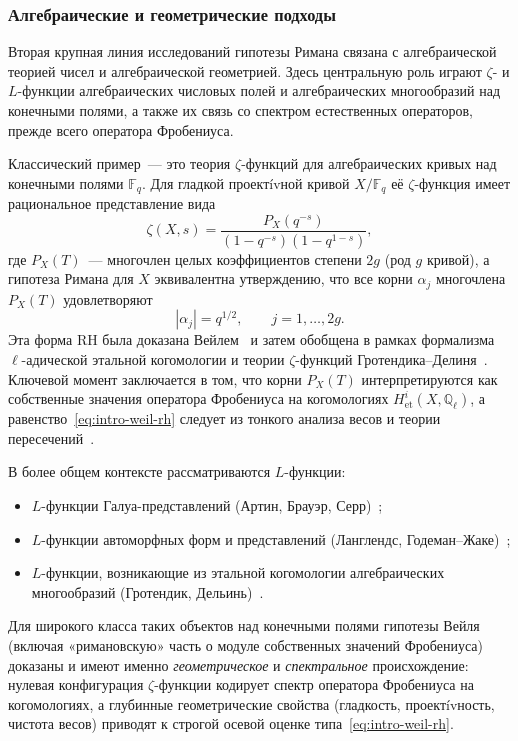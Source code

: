 \documentclass{article}
\numberwithin{equation}{section}
\theoremstyle{plain}
\theoremstyle{definition}
\theoremstyle{remark}
\def\alpha{α}\def\beta{β}\def\gamma{γ}\def\Gamma{Γ}%
\begin{document}
\subsubsection{Алгебраические и геометрические подходы}
\label{subsubsec:alg-geom-approaches}

\noindent
Вторая крупная линия исследований гипотезы Римана связана с алгебраической теорией чисел и алгебраической геометрией. 
Здесь центральную роль играют $\zeta$- и $L$-функции алгебраических числовых полей и алгебраических многообразий над конечными полями, а также их связь со спектром естественных операторов, прежде всего оператора Фробениуса.

\medskip

\noindent
Классический пример~--- это теория $\zeta$-функций для алгебраических кривых над конечными полями $\mathbb F_q$.
Для гладкой проектívной кривой $X/\mathbb F_q$ её $\zeta$-функция имеет рациональное представление вида
\begin{equation}
\label{eq:intro-weil-zeta}
\zeta(X,s)
=\frac{P_X(q^{-s})}{(1-q^{-s})(1-q^{1-s})},
\end{equation}
где $P_X(T)$~--- многочлен целых коэффициентов степени $2g$ (род $g$ кривой), а гипотеза Римана для $X$ эквивалентна утверждению, что все корни $\alpha_j$ многочлена $P_X(T)$ удовлетворяют
\begin{equation}
\label{eq:intro-weil-rh}
|\alpha_j|=q^{1/2},
\qquad j=1,\dots,2g.
\end{equation}
Эта форма RH была доказана Вейлем~\cite{Weil1948} и затем обобщена в рамках формализма $\ell$-адической этальной когомологии и теории $\zeta$-функций Гротендика–Делиня~\cite{Grothendieck1965,DeligneWeilII}. 
Ключевой момент заключается в том, что корни $P_X(T)$ интерпретируются как собственные значения оператора Фробениуса на когомологиях $H_{\mathrm{et}}^i(X,\mathbb Q_\ell)$, а равенство~\eqref{eq:intro-weil-rh} следует из тонкого анализа весов и теории пересечений~\cite{Serre1968,DeligneWeilII}.

\medskip

\noindent
В более общем контексте рассматриваются $L$-функции:
\begin{itemize}
  \item $L$-функции Галуа-представлений (Артин, Брауэр, Серр)~\cite{Artin1924,Serre1968};
  \item $L$-функции автоморфных форм и представлений (Ланглендс, Годеман–Жаке)~\cite{GodementJacquet1972,Gelbart1971};
  \item $L$-функции, возникающие из этальной когомологии алгебраических многообразий (Гротендик, Дельинь)~\cite{Grothendieck1965,DeligneWeilII}.
\end{itemize}
Для широкого класса таких объектов над конечными полями гипотезы Вейля (включая «римановскую» часть о модуле собственных значений Фробениуса) доказаны и имеют именно \emph{геометрическое} и \emph{спектральное} происхождение: 
нулевая конфигурация $\zeta$-функции кодирует спектр оператора Фробениуса на когомологиях, а глубинные геометрические свойства (гладкость, проектívность, чистота весов) приводят к строгой осевой оценке типа~\eqref{eq:intro-weil-rh}.
\end{document}
